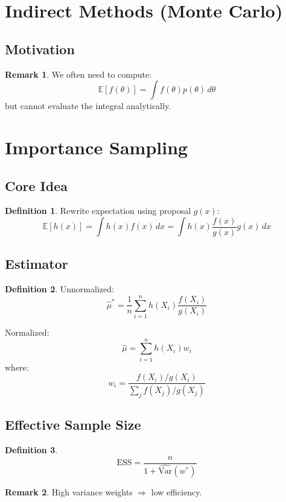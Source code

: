 \documentclass[12pt,oneside]{book}
\numberwithin{equation}{section}
\theoremstyle{definition}
\newtheorem{definition}{Definition}[section]
\newtheorem{remark}{Remark}[section]
\theoremstyle{plain}
\theoremstyle{remark}
\newcommand{\E}{\mathbb{E}}
\newcommand{\Var}{\mathrm{Var}}
\begin{document}
\section{Indirect Methods (Monte Carlo)}

\subsection{Motivation}

\begin{remark}
We often need to compute:
$$
\E[f(\theta)] = \int f(\theta)p(\theta)\, d\theta
$$
but cannot evaluate the integral analytically.  
\end{remark}

\section{Importance Sampling}

\subsection{Core Idea}

\begin{definition}
Rewrite expectation using proposal $g(x)$:
$$
\E[h(x)]
=
\int h(x) f(x)\, dx
=
\int h(x)\frac{f(x)}{g(x)} g(x)\, dx
$$
\end{definition}

\subsection{Estimator}

\begin{definition}
Unnormalized:
$$
\hat{\mu}^*
=
\frac{1}{n}
\sum_{i=1}^n h(X_i)\frac{f(X_i)}{g(X_i)}
$$

Normalized:
$$
\hat{\mu}
=
\sum_{i=1}^n h(X_i) w_i
$$
where:
$$
w_i =
\frac{f(X_i)/g(X_i)}{\sum_j f(X_j)/g(X_j)}
$$
\end{definition}

\subsection{Effective Sample Size}

\begin{definition}
$$
\text{ESS}
=
\frac{n}{1 + \widehat{\Var}(w^*)}
$$
\end{definition}

\begin{remark}
High variance weights $\Rightarrow$ low efficiency.
\end{remark}
\end{document}
